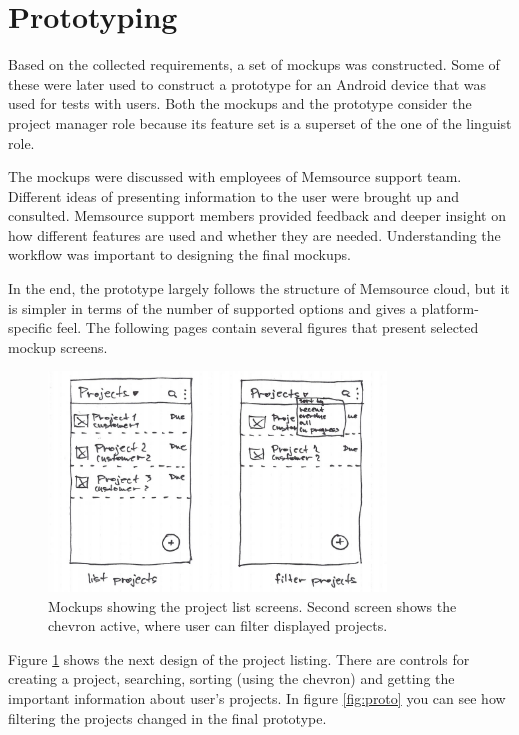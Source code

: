 \section{Prototyping}

Based on the collected requirements, a set of mockups was constructed. Some of these were later used to construct a prototype for an Android device that was used for tests with users. Both the mockups and the prototype consider the project manager role because its feature set is a superset of the one of the linguist role.

The mockups were discussed with employees of Memsource support team. Different ideas of presenting information to the user were brought up and consulted. Memsource support members provided feedback and deeper insight on how different features are used and whether they are needed. Understanding the workflow was important to designing the final mockups.

In the end, the prototype largely follows the structure of Memsource cloud, but it is simpler in terms of the number of supported options and gives a platform-specific feel. The following pages contain several figures that present selected mockup screens.



\begin{figure}[H]
	\includegraphics[width=0.8\textwidth]{pics/projects1}
	\caption{Mockups showing the project list screens. Second screen shows the chevron active, where user can filter displayed projects.}
	\label{mock2}
\end{figure}


Figure \ref{mock2} shows the next design of the project listing. There are controls for creating a project, searching, sorting (using the chevron) and getting the important information about user's projects. In figure \ref{fig:proto} you can see how filtering the projects changed in the final prototype.




